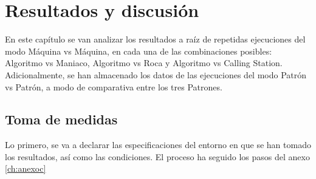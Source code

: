 \chapter{Resultados y discusión}

En este capítulo se van analizar los resultados  a raíz de repetidas ejecuciones del modo Máquina vs Máquina, en cada una de las combinaciones posibles: Algoritmo vs Maniaco, Algoritmo vs Roca y Algoritmo vs Calling Station. Adicionalmente, se han almacenado los datos de las ejecuciones del modo Patrón vs Patrón, a modo de comparativa entre los tres Patrones.

\section{Toma de medidas}
\label{sec:toma}

Lo primero, se va a declarar las especificaciones del entorno en que se han tomado los resultados, así como las condiciones. El proceso ha seguido los pasos del anexo \ref{ch:anexoc}

